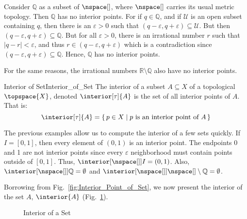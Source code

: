 \documentclass{article}                                                        %
\begin{document}
        \begin{example}
            Consider $\mathbb{Q}$ as a subset of $\nspace[]$, where $\nspace[]$
            carries its usual metric topology. Then $\mathbb{Q}$ has no interior
            points. For if $q\in\mathbb{Q}$, and if $\mathcal{U}$ is an open
            subset containing $q$, then there is an $\varepsilon>0$ such that
            $(q-\varepsilon,q+\varepsilon)\subseteq\mathcal{U}$. But then
            $(q-\varepsilon,q+\varepsilon)\subseteq\mathbb{Q}$. But for all
            $\varepsilon>0$, there is an irrational number $r$ such that
            $|q-r|<\varepsilon$, and thus $r\in(q-\varepsilon,q+\varepsilon)$
            which is a contradiction since
            $(q-\varepsilon,q+\varepsilon)\subseteq\mathbb{Q}$. Hence,
            $\mathbb{Q}$ has no interior points.
        \end{example}
        \begin{example}
            For the same reasons, the irrational numbers
            $\mathbb{R}\setminus\mathbb{Q}$ also have no interior points.
        \end{example}
        \begin{fdefinition}{Interior of Set}{Interior_of_Set}
            The interior of a subset $A\subseteq{X}$ of a topological
            $\topspace{X}$, denoted $\interior[\tau]{A}$ is the set of all
            interior points of $A$. That is:
            \begin{equation*}
                \interior[\tau]{A}=\{\,p\in{X}\;|\;p
                    \textrm{ is an interior point of }A\,\}
            \end{equation*}
        \end{fdefinition}
        \begin{example}
            The previous examples allow us to compute the interior of a few sets
            quickly. If $I=[0,1]$, then every element of $(0,1)$ is an interior
            point. The endpoints 0 and 1 are not interior points since every
            $\varepsilon$ neighborhood must contain points outside of $[0,1]$.
            Thus, $\interior[{\nspace[]}]{I}=(0,1)$. Also,
            $\interior[{\nspace[]}]{\mathbb{Q}}=\emptyset$ and
            $\interior[{\nspace[]}]{\nspace[]\setminus\mathbb{Q}}=\emptyset$.
        \end{example}
        Borrowing from Fig.~\ref{fig:Interior_Point_of_Set}, we now present the
        interior of the set $A$, $\interior{A}$
        (Fig.~\ref{fig:Interior_of_Set}).
        \begin{figure}[H]
            \centering
            \captionsetup{type=figure}
            
            \caption{Interior of a Set}
            \label{fig:Interior_of_Set}
        \end{figure}
\end{document}
